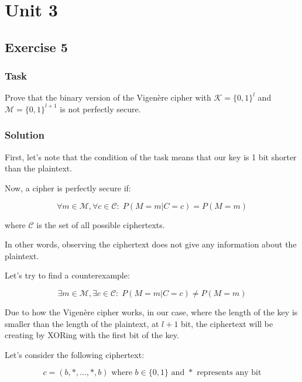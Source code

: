 \chapter{Unit 3}

\section{Exercise 5}

\subsection{Task}
Prove that the binary version of the Vigenère cipher with $\mathcal{K} = \{0, 1\}^l$ and $\mathcal{M} = \{0, 1\}^{l+1}$ is not perfectly secure.

\subsection{Solution}

First, let's note that the condition of the task means that our key is 1 bit shorter than the plaintext.

Now, a cipher is perfectly secure if:

\begin{equation}
\forall m \in \mathcal{M}, \forall c \in \mathcal{C}: \; P(M = m | C = c) = P(M = m)
\end{equation}

where $\mathcal{C}$ is the set of all possible ciphertexts.

In other words, observing the ciphertext does not give any information about the plaintext.

Let's try to find a counterexample:

\begin{equation}
\exists m \in \mathcal{M}, \exists c \in \mathcal{C}: \; P(M = m | C = c) \neq P(M = m)
\end{equation}

Due to how the Vigenère cipher works, in our case, where the length of the key is smaller than the length of the plaintext, at $l+1$ bit, the ciphertext will be creating by XORing with the first bit of the key.

Let's consider the following ciphertext:

\begin{equation}
c = (b, *, \ldots, *, b) \text{ where } b \in \{0,1\} \text{ and } * \text{ represents any bit}
\end{equation}

